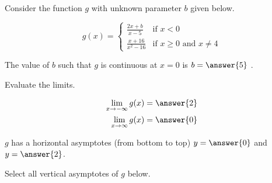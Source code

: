 \documentclass{ximera}
\author{Nela Lakos \and Kyle Parsons}
\begin{document}
\begin{exercise}

Consider the function $g$ with unknown parameter $b$ given below.

\[
g(x) = 
\begin{cases}
\frac{2x+b}{x-5} & \text{if } x<0\\
\frac{x+16}{x^2-16}  & \text{if } x\geq0 \text{ and } x\neq 4
\end{cases}
\]

The value of $b$ such that $g$ is continuous at $x=0$ is $b=\answer{5}$ .

\begin{exercise}

Evaluate the limits.

\begin{align*}
\lim_{x\to-\infty}g(x) &= \answer{2}\\
\lim_{x\to\infty}g(x) &= \answer{0}
\end{align*}

\begin{exercise}

$g$ has a horizontal asymptotes (from bottom to top) $y=\answer{0}$ and $y=\answer{2}$.

\begin{exercise}

Select all vertical asymptotes of $g$ below.

\begin{selectAll}
\end{selectAll}

\end{exercise}
\end{exercise}
\end{exercise}
\end{exercise}
\end{document}

